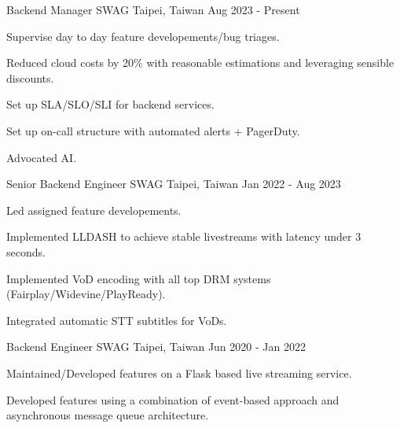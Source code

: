 

\begin{cventries}

  \cventry
    {Backend Manager} %
    {SWAG} %
    {Taipei, Taiwan} %
    {Aug 2023 - Present} %
    {
      \begin{cvitems} %
        \item {Supervise day to day feature developements/bug triages. }
        \item {Reduced cloud costs by 20\% with reasonable estimations and leveraging sensible discounts. }
        \item {Set up SLA/SLO/SLI for backend services. }
        \item {Set up on-call structure with automated alerts + PagerDuty. }
        \item {Advocated AI. }
      \end{cvitems}
    }
  \cventry
    {Senior Backend Engineer} %
    {SWAG} %
    {Taipei, Taiwan} %
    {Jan 2022 - Aug 2023} %
    {
      \begin{cvitems} %
        \item {Led assigned feature developements. }
        \item {Implemented LLDASH to achieve stable livestreams with latency under 3 seconds. }
        \item {Implemented VoD encoding with all top DRM systems (Fairplay/Widevine/PlayReady). }
        \item {Integrated automatic STT subtitles for VoDs. }
      \end{cvitems}
    }
  \cventry
    {Backend Engineer} %
    {SWAG} %
    {Taipei, Taiwan} %
    {Jun 2020 - Jan 2022} %
    {
      \begin{cvitems} %
        \item {Maintained/Developed features on a Flask based live streaming service. }
        \item {Developed features using a combination of event-based approach and asynchronous message queue architecture. }

\end{cvitems}}
\end{cventries}
